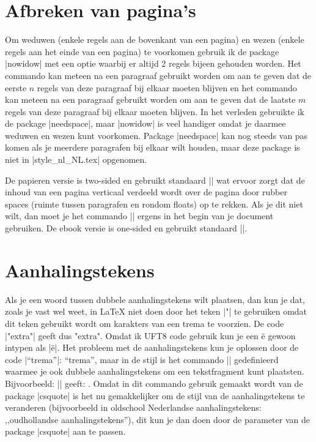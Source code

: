 \section{Afbreken van pagina's}
Om weduwen (enkele regels aan de bovenkant van een pagina) en wezen (enkele regels aan het einde van een pagina) te voorkomen gebruik ik de package |nowidow| met
een optie waarbij er altijd 2 regels bijeen gehouden worden.
Het commando \code[mathescape]{\\noclub[$n$]} kan meteen na een paragraaf gebruikt worden om aan te geven dat de eerste $n$ regels van deze paragraaf bij elkaar moeten 
blijven en het commando \code[mathescape]{\\nowidow[$m$]} kan meteen na een paragraaf gebruikt worden om aan te geven dat de laatste $m$ regels van deze paragraaf bij
elkaar moeten blijven.
In het verleden gebruikte ik de package |needspace|, maar |nowidow| is veel handiger omdat je daarmee   weduwen en wezen kunt voorkomen.
Package |needspace| kan nog steeds van pas komen als je meerdere paragrafen bij elkaar wilt houden, maar deze package is niet in |style_nl_NL.tex| opgenomen.

De papieren versie is two-sided en gebruikt standaard |\flushbottom| wat ervoor zorgt dat de inhoud van een pagina verticaal verdeeld wordt over de pagina door rubber spaces
(ruimte tussen paragrafen en rondom floats) op te rekken.
Als je dit niet wilt, dan moet je het commando |\raggedbottom| ergens in het begin van je document gebruiken.
De ebook versie is one-sided en gebruikt standaard |\raggedbottom|.

\section{Aanhalingstekens}
\label{sec:aanhalingstekens}
Als je een woord tussen dubbele aanhalingstekens wilt plaatsen, dan kun je dat, zoals je vast wel weet, in \LaTeX{} niet doen door het teken |"| te gebruiken omdat dit teken gebruikt
wordt om karakters van een trema te voorzien.
De code |"extra"| geeft dus "extra".
Omdat ik UFT8 code gebruik kun je een ë gewoon intypen als |ë|.
Het probleem met de aanhalingstekens kun je oplossen door de code |``trema''|: ``trema'', maar in de stijl is het commando |\dquote| gedefinieerd waarmee je ook dubbele
aanhalingstekens om een tekstfragment kunt plaatsten.
Bijvoorbeeld: || geeft: .
Omdat in dit commando gebruik gemaakt wordt van de package |csquote| is het nu gemakkelijker om de stijl van de aanhalingstekens te veranderen
(bijvoorbeeld in oldschool Nederlandse aanhalingstekens: ,,oudhollandse aanhalingstekens''), dit kun je dan doen door de parameter van de package |csquote| aan te passen.

